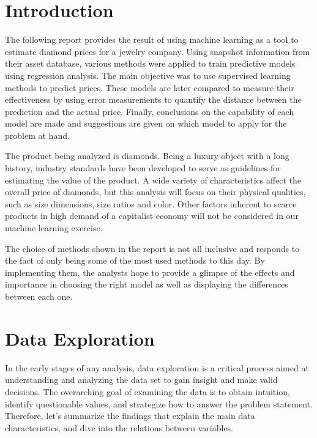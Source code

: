 \documentclass[
  paper=a4,
  ,captions=tableheading
]{scrartcl}
\begin{document}



{
\setcounter{tocdepth}{4}
\tableofcontents
}
\hypertarget{introduction}{%
\section{Introduction}\label{introduction}}

The following report provides the result of using machine learning as a
tool to estimate diamond prices for a jewelry company. Using snapshot
information from their asset database, various methods were applied to
train predictive models using regression analysis. The main objective
was to use supervised learning methods to predict prices. These models
are later compared to measure their effectiveness by using error
measurements to quantify the distance between the prediction and the
actual price. Finally, conclusions on the capability of each model are
made and suggestions are given on which model to apply for the problem
at hand.

The product being analyzed is diamonds. Being a luxury object with a
long history, industry standards have been developed to serve as
guidelines for estimating the value of the product. A wide variety of
characteristics affect the overall price of diamonds, but this analysis
will focus on their physical qualities, such as size dimensions, size
ratios and color. Other factors inherent to scarce products in high
demand of a capitalist economy will not be considered in our machine
learning exercise.

The choice of methods shown in the report is not all inclusive and
responds to the fact of only being some of the most used methods to this
day. By implementing them, the analysts hope to provide a glimpse of the
effects and importance in choosing the right model as well as displaying
the differences between each one.

\hypertarget{data-exploration}{%
\section{Data Exploration}\label{data-exploration}}

In the early stages of any analysis, data exploration is a critical
process aimed at understanding and analyzing the data set to gain
insight and make valid decisions. The overarching goal of examining the
data is to obtain intuition, identify questionable values, and
strategize how to answer the problem statement. Therefore, let's
summarize the findings that explain the main data characteristics, and
dive into the relations between variables.
\end{document}
